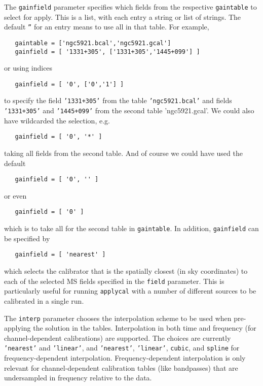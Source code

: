 The {\tt gainfield} parameter specifies which fields from the
respective {\tt gaintable} to select for apply.  This is a list,
with each entry a string or list of strings.  The default 
{\tt ''} for an entry means to use all in that table.  For
example,
\small
\begin{verbatim}
   gaintable = ['ngc5921.bcal','ngc5921.gcal']
   gainfield = [ '1331+305', ['1331+305','1445+099'] ]
\end{verbatim}
\normalsize
or using indices
\small
\begin{verbatim}
   gainfield = [ '0', ['0','1'] ]
\end{verbatim}
\normalsize
to specify the field {\tt '1331+305'} from the table 
{\tt 'ngc5921.bcal'} and fields {\tt '1331+305'} and 
{\tt '1445+099'} from the second table 'ngc5921.gcal'.
We could also have wildcarded the selection, e.g.
\small
\begin{verbatim}
   gainfield = [ '0', '*' ]
\end{verbatim}
\normalsize
taking all fields from the second table.  And of course we could have
used the default
\small
\begin{verbatim}
   gainfield = [ '0', '' ]
\end{verbatim}
\normalsize
or even
\small
\begin{verbatim}
   gainfield = [ '0' ]
\end{verbatim}
\normalsize
which is to take all for the second table in {\tt gaintable}. In addition, {\tt gainfield} can be specified by
\small
\begin{verbatim}
   gainfield = [ 'nearest' ]
\end{verbatim}
\normalsize
which selects the calibrator that is the spatially closest (in sky
coordinates) to each of the selected
MS fields specified in the {\tt field} parameter. This is particularly
useful for running {\tt applycal} with a number of different sources
to be calibrated in a single run.


The {\tt interp} parameter chooses the interpolation scheme to be used
when pre-applying the solution in the tables.  Interpolation in both
time and frequency (for channel-dependent calibrations) are supported.
The choices are currently {\tt 'nearest'} and {\tt 'linear'}, and 
{\tt 'nearest'}, {\tt 'linear'}, {\tt cubic}, and {\tt spline} for 
frequency-dependent interpolation.   Frequency-dependent interpolation
is only relevant for channel-dependent calibration tables (like
bandpasses)
that are undersampled in frequency relative to the data.

